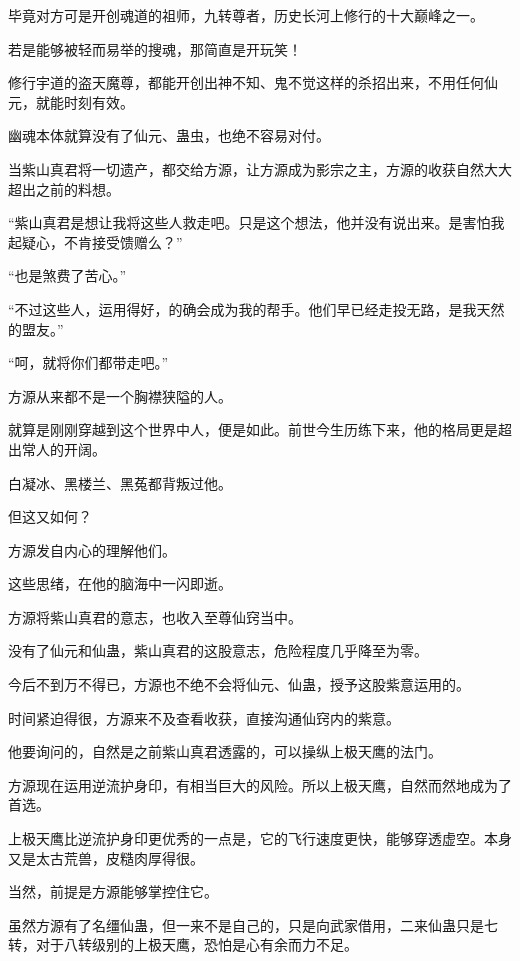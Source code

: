 
\begin{this_body}

毕竟对方可是开创魂道的祖师，九转尊者，历史长河上修行的十大巅峰之一。

若是能够被轻而易举的搜魂，那简直是开玩笑！

修行宇道的盗天魔尊，都能开创出神不知、鬼不觉这样的杀招出来，不用任何仙元，就能时刻有效。

幽魂本体就算没有了仙元、蛊虫，也绝不容易对付。

当紫山真君将一切遗产，都交给方源，让方源成为影宗之主，方源的收获自然大大超出之前的料想。

“紫山真君是想让我将这些人救走吧。只是这个想法，他并没有说出来。是害怕我起疑心，不肯接受馈赠么？”

“也是煞费了苦心。”

“不过这些人，运用得好，的确会成为我的帮手。他们早已经走投无路，是我天然的盟友。”

“呵，就将你们都带走吧。”

方源从来都不是一个胸襟狭隘的人。

就算是刚刚穿越到这个世界中人，便是如此。前世今生历练下来，他的格局更是超出常人的开阔。

白凝冰、黑楼兰、黑菟都背叛过他。

但这又如何？

方源发自内心的理解他们。

这些思绪，在他的脑海中一闪即逝。

方源将紫山真君的意志，也收入至尊仙窍当中。

没有了仙元和仙蛊，紫山真君的这股意志，危险程度几乎降至为零。

今后不到万不得已，方源也不绝不会将仙元、仙蛊，授予这股紫意运用的。

时间紧迫得很，方源来不及查看收获，直接沟通仙窍内的紫意。

他要询问的，自然是之前紫山真君透露的，可以操纵上极天鹰的法门。

方源现在运用逆流护身印，有相当巨大的风险。所以上极天鹰，自然而然地成为了首选。

上极天鹰比逆流护身印更优秀的一点是，它的飞行速度更快，能够穿透虚空。本身又是太古荒兽，皮糙肉厚得很。

当然，前提是方源能够掌控住它。

虽然方源有了名缰仙蛊，但一来不是自己的，只是向武家借用，二来仙蛊只是七转，对于八转级别的上极天鹰，恐怕是心有余而力不足。


\end{this_body}
